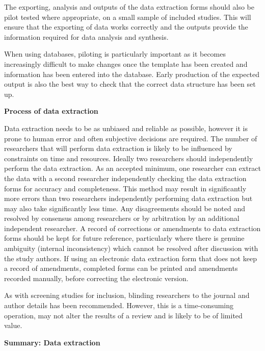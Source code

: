 \documentclass[
  10pt,
  a4paper,
  DIV=11,
  numbers=noendperiod]{scrreprt}
\begin{document}
The exporting, analysis and outputs of the data extraction forms should
also be pilot tested where appropriate, on a small sample of included
studies. This will ensure that the exporting of data works correctly and
the outputs provide the information required for data analysis and
synthesis.

When using databases, piloting is particularly important as it becomes
increasingly difficult to make changes once the template has been
created and information has been entered into the database. Early
production of the expected output is also the best way to check that the
correct data structure has been set up.

\textbf{Process of data extraction}

Data extraction needs to be as unbiased and reliable as possible,
however it is prone to human error and often subjective decisions are
required. The number of researchers that will perform data extraction is
likely to be influenced by constraints on time and resources. Ideally
two researchers should independently perform the data extraction. As an
accepted minimum, one researcher can extract the data with a second
researcher independently checking the data extraction forms for accuracy
and completeness. This method may result in significantly more errors
than two researchers independently performing data extraction but may
also take significantly less time. Any disagreements should be noted and
resolved by consensus among researchers or by arbitration by an
additional independent researcher. A record of corrections or amendments
to data extraction forms should be kept for future reference,
particularly where there is genuine ambiguity (internal inconsistency)
which cannot be resolved after discussion with the study authors. If
using an electronic data extraction form that does not keep a record of
amendments, completed forms can be printed and amendments recorded
manually, before correcting the electronic version.

As with screening studies for inclusion, blinding researchers to the
journal and author details has been recommended. However, this is a
time-consuming operation, may not alter the results of a review and is
likely to be of limited value.

\textbf{Summary: Data extraction}
\end{document}
